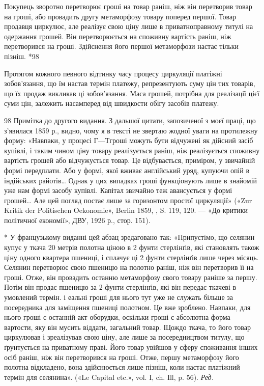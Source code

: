 Покупець зворотно перетворює гроші на товар раніш, ніж він перетворив товар на гроші, або провадить
другу метаморфозу товару поперед першої. Товар продавця циркулює, але реалізує свою ціну лише в
приватноправному титулі на одержання
грошей. Він перетворюється на споживну вартість раніш, ніж перетворився на гроші. Здійснення його
першої метаморфози настає тільки пізніш. *98

Протягом кожного певного відтинку часу процесу циркуляції платіжні зобов’язання, що їм настав термін
платежу, репрезентують суму цін тих товарів, що їх продаж викликав ці зобов’язання. Маса грошей,
потрібна для реалізації цієї суми цін,
залежить насамперед від швидкости обігу засобів платежу.

98 Примітка до другого видання. З дальшої цитати, запозиченої з моєї праці, що з’явилася 1859 р.,
видно, чому я в тексті не звертаю жодної уваги на протилежну форму: «Навпаки, у процесі $Г — Т г$роші
можуть бути відчужені як дійсний засіб купівлі, і таким чином ціну товару реалізується раніш, ніж
реалізується споживну вартість грошей або відчужується товар. Це відбувається, приміром, у звичайній
формі передплати. Або у формі, якої вживає англійський уряд, купуючи опій в індійських райотів\dots{}
Однак у цих випадках гроші функціонують лише в знайомій
уже нам формі засобу купівлі. Капітал звичайно теж авансується у формі грошей\dots{} Але цей погляд
постає лише за горизонтом простої циркуляції» («Zur Kritik der Politischen Oekonomie», Berlin 1859,
, S. 119, 120. — «До критики політичної економії», ДВУ, 1926 р., стор. 151).

*  У французькому виданні цей абзац зредаговано так: «Припустімо, що селянин купує у ткача 20 метрів
полотна ціною в 2 фунти стерлінґів, які становлять також ціну одного квартера пшениці, і сплачує ці
2 фунти стерлінґів лише через місяць. Селянин перетворює свою пшеницю на полотно раніш, ніж він
перетворив її на гроші. Отже, він провадить останню метаморфозу свого товару раніше за першу. Потім
він продає
пшеницю за 2 фунти стерлінґів, які він передає ткачеві в умовлений термін. і еальні гроші для нього
тут уже не служать більше за посередника для заміщення пшениці полотном. Це вже зроблено. Навпаки,
для нього гроші є останній акт оборудки, оскільки гроші є абсолютна форма вартости, яку він мусить
віддати, загальний товар. ІЦождо ткача, то його товар циркулював і зреалізував свою ціну, але лише
за посередництвом титулу, що ґрунтується на приватному праві. Його товар увійшов у сферу споживання
інших осіб раніш, ніж він перетворився на гроші. Отже, першу метаморфозу його полотна відкладено,
вона здійснюється лише пізніш, коли настає платіжний термін для селянина». («Le Capital etc.», vol.
I, ch. Ill, p. 56). \emph{Ред.}
\parbreak{}  %
